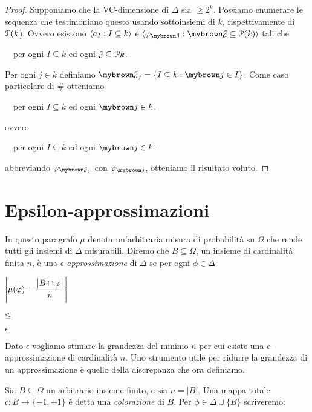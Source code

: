 \begin{proof}
Supponiamo che la VC-dimensione di $\Delta$ sia $\ge 2^k$. Possiamo enumerare le sequenza che testimoniano questo usando sottoinsiemi di $k$, rispettivamente di $\P(k$). Ovvero esistono $\<a_I: I\subseteq k\>$ e $\<\phi_{\mr \J}: {\mr \J}\subseteq \P(k)\>$ tali che 

\ \  per ogni $I\subseteq k$ ed ogni $\J\subseteq \P k$.

Per ogni $j\in k$ definiamo ${\mr \J_j}=\{I\subseteq k: {\mr j}\in I\}$. Come caso particolare di $\#$ otteniamo

\ \  per ogni $I\subseteq k$ ed ogni ${\mr j}\in k$.

ovvero

\ \  per ogni $I\subseteq k$ ed ogni ${\mr j}\in k$.

abbreviando $\phi_{\mr \J_j}$ con $\phi_{\mr j}$, otteniamo il risultato voluto.
\end{proof}


\section{Epsilon-approssimazioni}

\def\Av{\mathbin{\textrm{Av}}}
\def\disc{\mathbin{\textrm{disc}}}
\def\ceq#1#2#3{\parbox[t]{25ex}{$\displaystyle #1$}\parbox{5ex}{$\displaystyle\hfil #2$}{$\displaystyle #3$}}


In questo paragrafo $\mu$ denota un'arbitraria misura di probabilit\`a su $\Omega$ che rende tutti gli insiemi di $\Delta$ misurabili. Diremo che $B\subseteq\Omega$, un insieme di cardinalit\`a finita $n$, \`e una \emph{$\epsilon$-approssimazione\/} di $\Delta$ se per ogni $\phi\in\Delta$

\ceq{\hfill\left|\mu(\phi) - \frac{\big|B\cap\phi\big|}{n}\right|}{\le}{\epsilon}

Dato $\epsilon$ vogliamo stimare la grandezza del minimo $n$ per cui esiste una $\epsilon$-approssimazione di cardinalit\`a $n$. Uno strumento utile per ridurre la grandezza di un approssimazione \`e quello della discrepanza che ora definiamo. 

Sia $B\subseteq\Omega$ un arbitrario insieme finito, e sia $n=|B|$.  Una mappa totale $c:B\to\{-1,+1\}$ \`e detta una \emph{colorazione\/} di $B$.  Per $\phi\in\Delta\cup\{B\}$ scriveremo:


